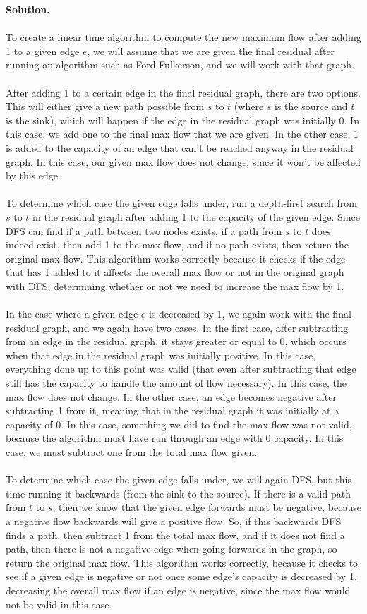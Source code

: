 \documentclass[11pt]{article}
\newcommand\solution{%
  \textbf{Solution.}\\%
}
\begin{document}
\begin{enumerate}
\solution \\
To create a linear time algorithm to compute the new maximum flow after adding 1 to a given edge $e$, we will assume that we are given the final residual after running an algorithm such as Ford-Fulkerson, and we will work with that graph. \\
\\
After adding 1 to a certain edge in the final residual graph, there are two options. This will either give a new path possible from $s$ to $t$ (where $s$ is the source and $t$ is the sink), which will happen if the edge in the residual graph was initially 0. In this case, we add one to the final max flow that we are given. In the other case, 1 is added to the capacity of an edge that can't be reached anyway in the residual graph. In this case, our given max flow does not change, since it won't be affected by this edge. \\
\\
To determine which case the given edge falls under, run a depth-first search from $s$ to $t$ in the residual graph after adding 1 to the capacity of the given edge. Since DFS can find if a path between two nodes exists, if a path from $s$ to $t$ does indeed exist, then add 1 to the max flow, and if no path exists, then return the original max flow. This algorithm works correctly because it checks if the edge that has 1 added to it affects the overall max flow or not in the original graph with DFS, determining whether or not we need to increase the max flow by 1. \\
\\
In the case where a given edge $e$ is decreased by 1, we again work with the final residual graph, and we again have two cases. In the first case, after subtracting from an edge in the residual graph, it stays greater or equal to 0, which occurs when that edge in the residual graph was initially positive. In this case, everything done up to this point was valid (that even after subtracting that edge still has the capacity to handle the amount of flow necessary). In this case, the max flow does not change. In the other case, an edge becomes negative after subtracting 1 from it, meaning that in the residual graph it was initially at a capacity of 0. In this case, something we did to find the max flow was not valid, because the algorithm must have run through an edge with 0 capacity. In this case, we must subtract one from the total max flow given. \\
\\
To determine which case the given edge falls under, we will again DFS, but this time running it backwards (from the sink to the source). If there is a valid path from $t$ to $s$, then we know that the given edge forwards must be negative, because a negative flow backwards will give a positive flow. So, if this backwards DFS finds a path, then subtract 1 from the total max flow, and if it does not find a path, then there is not a negative edge when going forwards in the graph, so return the original max flow. This algorithm works correctly, because it checks to see if a given edge is negative or not once some edge's capacity is decreased by 1, decreasing the overall max flow if an edge is negative, since the max flow would not be valid in this case.

\end{enumerate}
\end{document}
